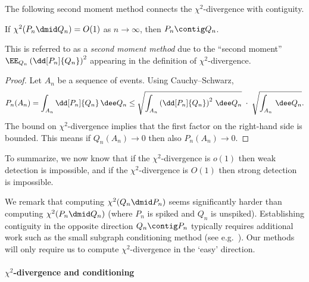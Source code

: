 \documentclass{article}
\begin{document}
The following second moment method connects the $\chi^2$-divergence with contiguity.

\begin{lemma}
\label{lem:sec}
If $\chi^2(P_n \dmid Q_n) = O(1)$ as $n \to \infty$, then $P_n \contig Q_n$.
\end{lemma}
\noindent This is referred to as a \emph{second moment method} due to the ``second moment'' $\EE_{Q_n}\left(\dd[P_n]{Q_n}\right)^2$ appearing in the definition of $\chi^2$-divergence.
\begin{proof}
Let $A_n$ be a sequence of events. Using Cauchy--Schwarz,
\begin{align*}
P_n(A_n) 
= \int_{A_n} \dd[P_n]{Q_n} \,\dee Q_n \le \sqrt{\int_{A_n} \left( \dd[P_n]{Q_n} \right)^2 \,\dee Q_n} \;\cdot\; \sqrt{\int_{A_n} \,\dee Q_n}. %
\end{align*}
The bound on $\chi^2$-divergence implies that the first factor on the right-hand side is bounded. This means if $Q_n(A_n) \to 0$ then also $P_n(A_n) \to 0$.
\end{proof}

To summarize, we now know that if the $\chi^2$-divergence is $o(1)$ then weak detection is impossible, and if the $\chi^2$-divergence is $O(1)$ then strong detection is impossible.

We remark that computing $\chi^2(Q_n \dmid P_n)$ seems significantly harder than computing $\chi^2(P_n \dmid Q_n)$ (where $P_n$ is spiked and $Q_n$ is unspiked). Establishing contiguity in the opposite direction $Q_n \contig P_n$ typically requires additional work such as the small subgraph conditioning method (see e.g.\ \cite{mns,bmnn,wor-survey}). Our methods will only require us to compute $\chi^2$-divergence in the `easy' direction.





\paragraph{$\chi^2$-divergence and conditioning}
\end{document}
